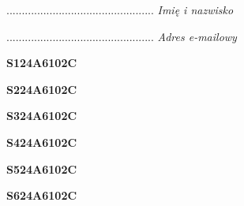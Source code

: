 \begin{turn}{90}\begin{minipage}{\linewidth} \vspace{20mm} ................................................  \textit{Imię i nazwisko}\end{minipage}\end{turn}

\begin{turn}{90}\begin{minipage}{\linewidth} \vspace{20mm} ................................................  \textit{Adres e-mailowy}\end{minipage}\end{turn}

\begin{turn}{90}\huge \begin{minipage}{\linewidth} \vspace{10mm}\textbf{S124A6102C}\end{minipage}\end{turn}

\begin{turn}{90}\huge \begin{minipage}{\linewidth} \vspace{10mm}\textbf{S224A6102C}\end{minipage}\end{turn}

\begin{turn}{90}\huge \begin{minipage}{\linewidth} \vspace{10mm}\textbf{S324A6102C}\end{minipage}\end{turn}

\begin{turn}{90}\huge \begin{minipage}{\linewidth} \vspace{10mm}\textbf{S424A6102C}\end{minipage}\end{turn}

\begin{turn}{90}\huge \begin{minipage}{\linewidth} \vspace{10mm}\textbf{S524A6102C}\end{minipage}\end{turn}

\begin{turn}{90}\huge \begin{minipage}{\linewidth} \vspace{10mm}\textbf{S624A6102C}\end{minipage}\end{turn}

